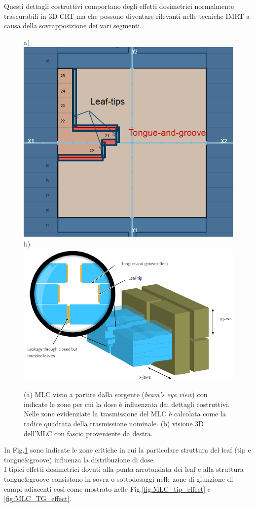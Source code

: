 Questi dettagli costruttivi comportano degli effetti dosimetrici normalmente trascurabili in 3D-CRT ma che possono diventare rilevanti nelle tecniche IMRT a causa della sovrapposizione dei vari segmenti.
\begin{figure}
\centering
a)\includegraphics[width=.35\textwidth]{./cap2/MLC_tip-tg.png}
b)\includegraphics[width=.5\textwidth]{./cap2/MLC_tip-tg_3D.png}
\caption{(a) MLC visto a partire dalla sorgente (\textit{beam's eye view}) con indicate le zone per cui la dose è influenzata dai dettagli costruttivi. Nelle zone evidenziate la trasmissione del MLC è calcolata come la radice quadrata della trasmissione nominale. (b) visione 3D dell'MLC con fascio proveniente da destra.}
\label{fig:MLC_Regions}
\end{figure}
In Fig.\ref{fig:MLC_Regions} sono indicate le zone critiche in cui la particolare struttura del leaf (tip e tongue\&{}groove) influenza la distribuzione di dose.\\
I tipici effetti dosimetrici dovuti alla punta arrotondata dei leaf e alla struttura tongue\&{}groove consistono in sovra o sottodosaggi nelle zone di giunzione di campi adiacenti così come mostrato nelle Fig.\ref{fig:MLC_tip_effect} e \ref{fig:MLC_TG_effect}.


